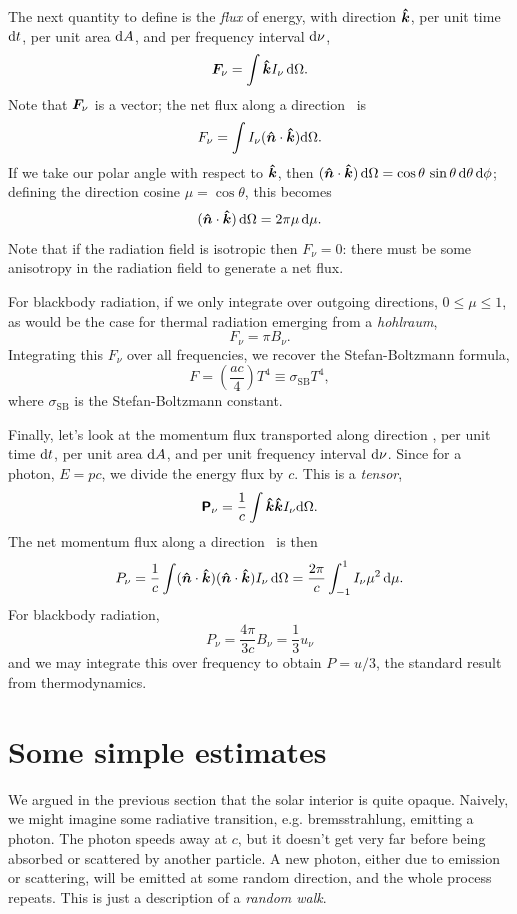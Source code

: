 The next quantity to define is the \emph{flux} of energy, with direction $\boldsymbol{\hat{k}}$, per unit time $\mathrm{d} t$,  per unit area $\mathrm{d} A$, and per frequency interval $\mathrm{d}\nu$,
\begin{equation}\label{e.radiation-flux}
\boldsymbol{F}_{\nu} = \int \boldsymbol{\hat{k}} I_{\nu} \,\mathrm{d}\Omega.
\end{equation}
Note that $\boldsymbol{F}_{\nu}$ is a vector;  the net flux along a direction \unitn\ is
\[ F_{\nu} = \int I_{\nu}(\boldsymbol{\hat{n}}\cdot\boldsymbol{\hat{k}})\mathrm{d}\Omega. \]
If we take our polar angle with respect to $\boldsymbol{\hat{k}}$, then $(\boldsymbol{\hat{n}}\cdot\boldsymbol{\hat{k}})\,\mathrm{d}\Omega = \cos\theta\,\sin\theta\,\mathrm{d}\theta\,\mathrm{d} \phi$; defining the direction cosine $\mu = \cos\theta$, this becomes 
\[ (\boldsymbol{\hat{n}}\cdot\boldsymbol{\hat{k}})\,\mathrm{d}\Omega = 2\pi \mu\,\mathrm{d}\mu. \]
Note that if the radiation field is isotropic then $F_{\nu}=0$: there must be some anisotropy in the radiation field to generate a net flux.

For blackbody radiation, if we only integrate over outgoing directions, $0\le \mu\le 1$, as would be the case for thermal radiation emerging from a \emph{hohlraum},
\[ F_{\nu} = \pi B_{\nu}.\]
Integrating this $F_{\nu}$ over all frequencies, we recover the Stefan-Boltzmann formula,
\[ F = \left(\frac{ac}{4}\right) T^{4} \equiv \sigma_{\mathrm{SB}} T^{4}, \]
where $\sigma_{\mathrm{SB}}$ is the Stefan-Boltzmann constant.

Finally, let's look at the momentum flux transported along direction \unitk, per unit time $\mathrm{d} t$, per unit area $\mathrm{d} A$, and per unit frequency interval $\mathrm{d}\nu$.  Since for a photon, $E = pc$, we divide the energy flux by $c$.
This is a \emph{tensor},
\begin{equation}\label{e.radiation-pressure-tensor}
\boldsymbol{\mathsf{P}}_{\nu} = \frac{1}{c}\int \boldsymbol{\hat{k}}\boldsymbol{\hat{k}} I_{\nu}\mathrm{d}\Omega.
\end{equation}
The net momentum flux along a direction \unitn\ is then
\[ P_{\nu} = \frac{1}{c}\int (\boldsymbol{\hat{n}}\cdot\boldsymbol{\hat{k}})(\boldsymbol{\hat{n}}\cdot\boldsymbol{\hat{k}}) I_{\nu}\,\mathrm{d} \Omega = \frac{2\pi}{c}\int_{-1}^{1} I_{\nu}\mu^{2}\,\mathrm{d}\mu. \]
For blackbody radiation, 
\[ P_{\nu} = \frac{4\pi}{3c} B_{\nu}  = \frac{1}{3}u_{\nu}\]
and we may integrate this over frequency to obtain $P = u/3$, the standard result from thermodynamics.

\section{Some simple estimates}

We argued in the previous section that the solar interior is quite opaque. Naively, we might imagine some radiative transition, e.g. bremsstrahlung, emitting a photon.  The photon speeds away at $c$, but it doesn't get very far before being absorbed or scattered by another particle. A new photon, either due to emission or scattering, will be emitted at some random direction, and the whole process repeats. This is just a description of a \emph{random walk}. 

